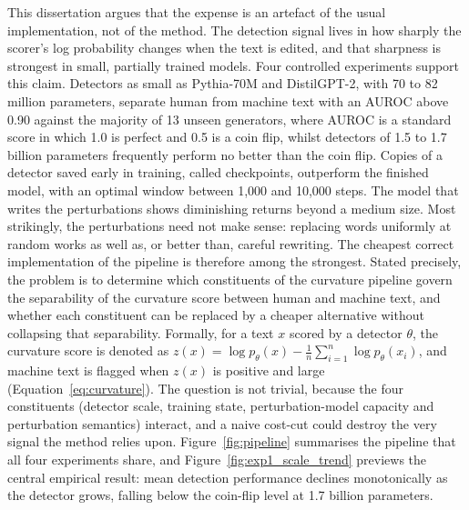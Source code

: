 \documentclass[logo,msc,cs]{infthesis}      %
\begin{document}
This dissertation argues that the expense is an artefact of the usual implementation, not of the method. The detection signal lives in how sharply the scorer's log probability changes when the text is edited, and that sharpness is strongest in small, partially trained models. Four controlled experiments support this claim. Detectors as small as Pythia-70M and DistilGPT-2, with 70 to 82 million parameters, separate human from machine text with an AUROC above 0.90 against the majority of 13 unseen generators, where AUROC is a standard score in which 1.0 is perfect and 0.5 is a coin flip, whilst detectors of 1.5 to 1.7 billion parameters frequently perform no better than the coin flip. Copies of a detector saved early in training, called checkpoints, outperform the finished model, with an optimal window between 1,000 and 10,000 steps. The model that writes the perturbations shows diminishing returns beyond a medium size. Most strikingly, the perturbations need not make sense: replacing words uniformly at random works as well as, or better than, careful rewriting. The cheapest correct implementation of the pipeline is therefore among the strongest.
Stated precisely, the problem is to determine which constituents of the curvature pipeline govern the separability of the curvature score between human and machine text, and whether each constituent can be replaced by a cheaper alternative without collapsing that separability. Formally, for a text $x$ scored by a detector $\theta$, the curvature score is denoted as $z(x) = \log p_\theta(x) - \frac{1}{n}\sum_{i=1}^{n} \log p_\theta(x_i)$, and machine text is flagged when $z(x)$ is positive and large (Equation~\ref{eq:curvature}). The question is not trivial, because the four constituents (detector scale, training state, perturbation-model capacity and perturbation semantics) interact, and a naive cost-cut could destroy the very signal the method relies upon. Figure~\ref{fig:pipeline} summarises the pipeline that all four experiments share, and Figure~\ref{fig:exp1_scale_trend} previews the central empirical result: mean detection performance declines monotonically as the detector grows, falling below the coin-flip level at 1.7 billion parameters.
\end{document}
